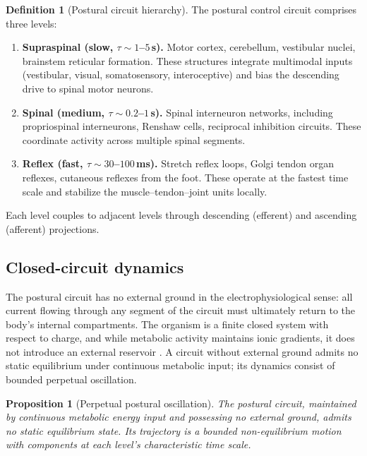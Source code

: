 \documentclass[11pt,twocolumn,a4paper]{article}
\newtheorem{proposition}[theorem]{Proposition}
\theoremstyle{definition}
\newtheorem{definition}[theorem]{Definition}
\theoremstyle{remark}
\begin{document}
\begin{definition}[Postural circuit hierarchy]
The postural control circuit comprises three levels:
\begin{enumerate}[label=(\roman*),leftmargin=*,itemsep=1pt]
\item \textbf{Supraspinal (slow, $\tau \sim 1$--$5$\,s).} Motor
cortex, cerebellum, vestibular nuclei, brainstem reticular
formation. These structures integrate multimodal inputs (vestibular,
visual, somatosensory, interoceptive) and bias the descending drive
to spinal motor neurons.
\item \textbf{Spinal (medium, $\tau \sim 0.2$--$1$\,s).} Spinal
interneuron networks, including propriospinal interneurons, Renshaw
cells, reciprocal inhibition circuits. These coordinate activity
across multiple spinal segments.
\item \textbf{Reflex (fast, $\tau \sim 30$--$100$\,ms).} Stretch
reflex loops, Golgi tendon organ reflexes, cutaneous reflexes from
the foot. These operate at the fastest time scale and stabilize
the muscle--tendon--joint units locally.
\end{enumerate}
Each level couples to adjacent levels through descending
(efferent) and ascending (afferent) projections.
\end{definition}

\subsection{Closed-circuit dynamics}

The postural circuit has no external ground in the
electrophysiological sense: all current flowing through any segment
of the circuit must ultimately return to the body's internal
compartments. The organism is a finite closed system with respect
to charge, and while metabolic activity maintains ionic gradients,
it does not introduce an external reservoir \citep{nicolis1977,%
prigogine1977,kandel2013}. A circuit without external ground admits
no static equilibrium under continuous metabolic input; its
dynamics consist of bounded perpetual oscillation.

\begin{proposition}[Perpetual postural oscillation]
\label{prop:perpetual}
The postural circuit, maintained by continuous metabolic energy
input and possessing no external ground, admits no static
equilibrium state. Its trajectory is a bounded non-equilibrium
motion with components at each level's characteristic time scale.
\end{proposition}
\end{document}
